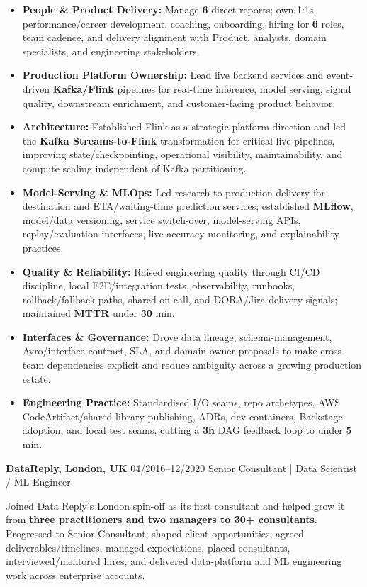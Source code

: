 \documentclass[]{../../../../friggeri-cv}
\renewcommand{\entry}[4]{%
  \parbox[t]{\dimexpr\textwidth-\entryleftinset\relax}{%
    \textbf{#2}%
    {\footnotesize\addfontfeature{Color=lightgray}\hspace{0.6em}#1}%
    \hfill%
    {\small\color{textcolor} #3}\\%
    #4\vspace{\parsep}%
  }\\}
\begin{document}
\begin{entrylist}
{{        }
        \begin{itemize}[leftmargin=1.1em]
            \item \footnotesize\textbf{People \& Product Delivery:} Manage \textbf{6} direct reports; own 1:1s, performance/career development, coaching, onboarding, hiring for \textbf{6} roles, team cadence, and delivery alignment with Product, analysts, domain specialists, and engineering stakeholders.
            \item \footnotesize\textbf{Production Platform Ownership:} Lead live backend services and event-driven \textbf{Kafka/Flink} pipelines for real-time inference, model serving, signal quality, downstream enrichment, and customer-facing product behavior.
            \item \footnotesize\textbf{Architecture:} Established Flink as a strategic platform direction and led the \textbf{Kafka Streams-to-Flink} transformation for critical live pipelines, improving state/checkpointing, operational visibility, maintainability, and compute scaling independent of Kafka partitioning.
            \item \footnotesize\textbf{Model-Serving \& MLOps:} Led research-to-production delivery for destination and ETA/waiting-time prediction services; established \textbf{MLflow}, model/data versioning, service switch-over, model-serving APIs, replay/evaluation interfaces, live accuracy monitoring, and explainability practices.
            \item \footnotesize\textbf{Quality \& Reliability:} Raised engineering quality through CI/CD discipline, local E2E/integration tests, observability, runbooks, rollback/fallback paths, shared on-call, and DORA/Jira delivery signals; maintained \textbf{MTTR} under \textbf{30} min.
            \item \footnotesize\textbf{Interfaces \& Governance:} Drove data lineage, schema-management, Avro/interface-contract, SLA, and domain-owner proposals to make cross-team dependencies explicit and reduce ambiguity across a growing production estate.
            \item \footnotesize\textbf{Engineering Practice:} Standardised I/O seams, repo archetypes, AWS CodeArtifact/shared-library publishing, ADRs, dev containers, Backstage adoption, and local test seams, cutting a \textbf{3h} DAG feedback loop to under \textbf{5} min.
        \end{itemize}
    }
    \entry
    {04/2016--12/2020}
    {DataReply, London, UK}
    {Senior Consultant | Data Scientist / ML Engineer}
    {
        {\small
        \setlength{\parindent}{0pt}
        \setlength{\leftskip}{0pt}
        Joined Data Reply's London spin-off as its first consultant and helped grow it from \textbf{three practitioners and two managers to 30+ consultants}. Progressed to Senior Consultant; shaped client opportunities, agreed deliverables/timelines, managed expectations, placed consultants, interviewed/mentored hires, and delivered data-platform and ML engineering work across enterprise accounts.

}}
\end{entrylist}
\end{document}
